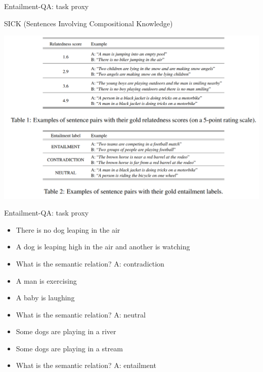 \documentclass[10pt]{beamer}
\begin{document}
\begin{frame}{Entailment-QA: task proxy}

SICK (Sentences Involving Compositional Knowledge) \cite{Marelli14}

\begin{center}
\includegraphics[scale=0.25]{images/sick.png}
\end{center}

\end{frame}


\begin{frame}{Entailment-QA: task proxy}

\begin{itemize} 
\item[] There is no dog leaping in the air
\item[] A dog is leaping high in the air and another is watching
\item[] What is the semantic relation? \alert{A: contradiction}
\end{itemize}

\begin{itemize} 
\item[] A man is exercising
\item[] A baby is laughing
\item[] What is the semantic relation? \alert{A: neutral}
\end{itemize}

\begin{itemize} 
\item[] Some dogs are playing in a river
\item[] Some dogs are playing in a stream
\item[] What is the semantic relation? \alert{A: entailment}
\end{itemize}
\end{frame}
\end{document}
